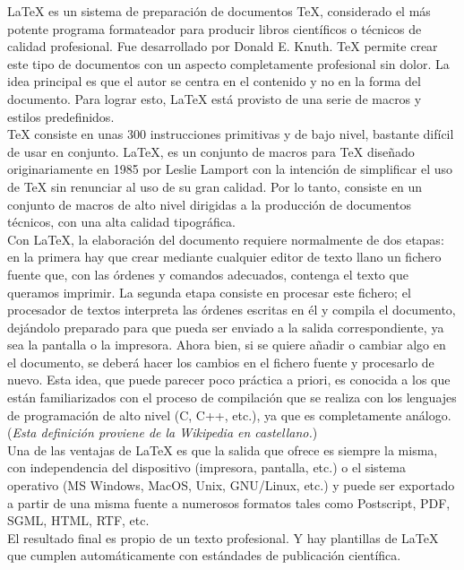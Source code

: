 \documentclass[11pt]{article}
\begin{document}
{\LaTeX} es un sistema de preparación de documentos {\TeX}, considerado el más potente programa formateador para producir libros científicos o técnicos de calidad profesional. Fue desarrollado por Donald E. Knuth. {\TeX} permite crear este tipo de documentos con un aspecto completamente profesional sin dolor. La idea principal es que el autor se centra en el contenido y no en la forma del documento. Para lograr esto, {\LaTeX} está provisto de una serie de macros y estilos predefinidos.\\

{\TeX} consiste en unas 300 instrucciones primitivas y de bajo nivel, bastante difícil de usar en conjunto. {\LaTeX}, es un conjunto de macros para {\TeX} diseñado originariamente en 1985 por Leslie Lamport con la intención de simplificar el uso de {\TeX} sin renunciar al uso de su gran calidad. Por lo tanto, consiste en un conjunto de macros de alto nivel dirigidas a la producción de documentos técnicos, con una alta calidad tipográfica. \\

Con {\LaTeX}, la elaboración del documento requiere normalmente de dos etapas: en la primera hay que crear mediante cualquier editor de texto llano un fichero fuente que, con las órdenes y comandos adecuados, contenga el texto que queramos imprimir. La segunda etapa consiste en procesar este fichero; el procesador de textos interpreta las órdenes escritas en él y compila el documento, dejándolo preparado para que pueda ser enviado a la salida correspondiente, ya sea la pantalla o la impresora. Ahora bien, si se quiere añadir o cambiar algo en el documento, se deberá hacer los cambios en el fichero fuente y procesarlo de nuevo. Esta idea, que puede parecer poco práctica a priori, es conocida a los que están familiarizados con el proceso de compilación que se realiza con los lenguajes de programación de alto nivel (C, C++, etc.), ya que es completamente análogo. ({\em Esta definición proviene de la Wikipedia en castellano.})\\

Una de las ventajas de {\LaTeX} es que la salida que ofrece es siempre la misma, con independencia del dispositivo (impresora, pantalla, etc.) o el sistema operativo (MS Windows, MacOS, Unix, GNU/Linux, etc.) y puede ser exportado a partir de una misma fuente a numerosos formatos tales como Postscript, PDF, SGML, HTML, RTF, etc. \\

El resultado final es propio de un texto profesional. Y hay plantillas de {\LaTeX} que cumplen automáticamente con estándades de publicación científica.\\
\end{document}
